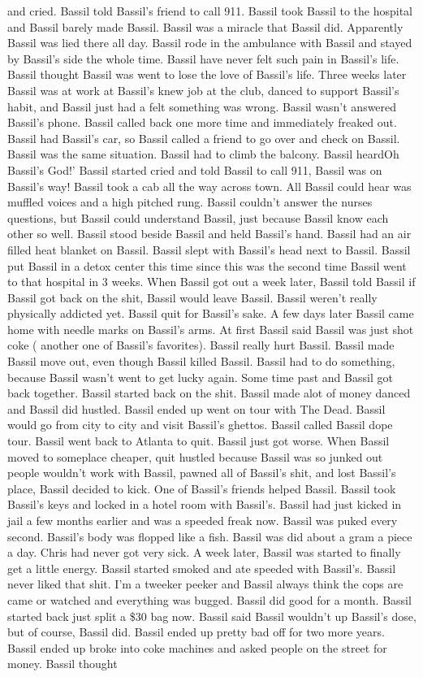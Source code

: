 \documentclass[12pt]{book}
\begin{document}
and cried. Bassil told Bassil's friend to call 911. Bassil took Bassil to the hospital and Bassil barely made Bassil. Bassil was a miracle that Bassil did. Apparently Bassil was lied there all day. Bassil rode in the ambulance with Bassil and stayed by Bassil's side the whole time. Bassil have never felt such pain in Bassil's life. Bassil thought Bassil was went to lose the love of Bassil's life. Three weeks later Bassil was at work at Bassil's knew job at the club, danced to support Bassil's habit, and Bassil just had a felt something was wrong. Bassil wasn't answered Bassil's phone. Bassil called back one more time and immediately freaked out. Bassil had Bassil's car, so Bassil called a friend to go over and check on Bassil. Bassil was the same situation. Bassil had to climb the balcony. Bassil heardOh Bassil's God!' Bassil started cried and told Bassil to call 911, Bassil was on Bassil's way! Bassil took a cab all the way across town. All Bassil could hear was muffled voices and a high pitched rung. Bassil couldn't answer the nurses questions, but Bassil could understand Bassil, just because Bassil know each other so well. Bassil stood beside Bassil and held Bassil's hand. Bassil had an air filled heat blanket on Bassil. Bassil slept with Bassil's head next to Bassil. Bassil put Bassil in a detox center this time since this was the second time Bassil went to that hospital in 3 weeks. When Bassil got out a week later, Bassil told Bassil if Bassil got back on the shit, Bassil would leave Bassil. Bassil weren't really physically addicted yet. Bassil quit for Bassil's sake. A few days later Bassil came home with needle marks on Bassil's arms. At first Bassil said Bassil was just shot coke ( another one of Bassil's favorites). Bassil really hurt Bassil. Bassil made Bassil move out, even though Bassil killed Bassil. Bassil had to do something, because Bassil wasn't went to get lucky again. Some time past and Bassil got back together. Bassil started back on the shit. Bassil made alot of money danced and Bassil did hustled. Bassil ended up went on tour with The Dead. Bassil would go from city to city and visit Bassil's ghettos. Bassil called Bassil dope tour. Bassil went back to Atlanta to quit. Bassil just got worse. When Bassil moved to someplace cheaper, quit hustled because Bassil was so junked out people wouldn't work with Bassil, pawned all of Bassil's shit, and lost Bassil's place, Bassil decided to kick. One of Bassil's friends helped Bassil. Bassil took Bassil's keys and locked in a hotel room with Bassil's. Bassil had just kicked in jail a few months earlier and was a speeded freak now. Bassil was puked every second. Bassil's body was flopped like a fish. Bassil was did about a gram a piece a day. Chris had never got very sick. A week later, Bassil was started to finally get a little energy. Bassil started smoked and ate speeded with Bassil's. Bassil never liked that shit. I'm a tweeker peeker and Bassil always think the cops are came or watched and everything was bugged. Bassil did good for a month. Bassil started back just split a \$30 bag now. Bassil said Bassil wouldn't up Bassil's dose, but of course, Bassil did. Bassil ended up pretty bad off for two more years. Bassil ended up broke into coke machines and asked people on the street for money. Bassil thought 
\end{document}
